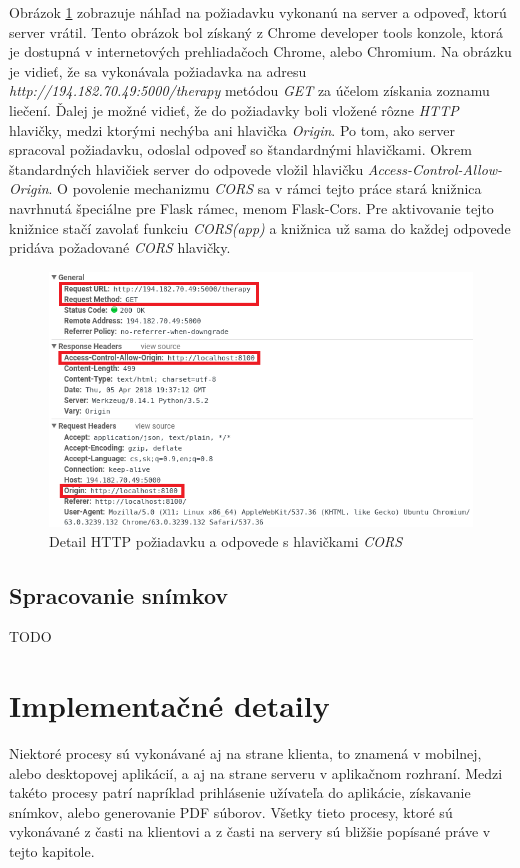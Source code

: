 Obrázok \ref{fig:cors} zobrazuje náhľad na požiadavku vykonanú na server a odpoveď, ktorú server vrátil. Tento obrázok bol získaný z Chrome developer tools konzole, ktorá je dostupná v internetových prehliadačoch Chrome, alebo Chromium. Na obrázku je vidieť, že sa vykonávala požiadavka na adresu \textit{http://194.182.70.49:5000/therapy} metódou \textit{GET} za účelom získania zoznamu liečení. Ďalej je možné vidieť, že do požiadavky boli vložené rôzne \textit{HTTP} hlavičky, medzi ktorými nechýba ani hlavička \textit{Origin}. Po tom, ako server spracoval požiadavku, odoslal odpoveď so štandardnými hlavičkami. Okrem štandardných hlavičiek server do odpovede vložil hlavičku \textit{Access-Control-Allow-Origin}. O povolenie mechanizmu \textit{CORS} sa v rámci tejto práce stará knižnica navrhnutá špeciálne pre Flask rámec, menom Flask-Cors.  Pre aktivovanie tejto knižnice stačí zavolať funkciu \textit{CORS(app)} a knižnica už sama do každej odpovede pridáva požadované \textit{CORS} hlavičky.
\begin{figure}[h]
  \centering
  \includegraphics[scale=0.8]{fig/cors.png}
  \caption{Detail HTTP požiadavku a odpovede s hlavičkami \textit{CORS}}
  \label{fig:cors}
\end{figure}

\subsection{Spracovanie snímkov}
TODO

\section{Implementačné detaily}
Niektoré procesy sú vykonávané aj na strane klienta, to znamená v mobilnej, alebo desktopovej aplikácií, a aj na strane serveru v aplikačnom rozhraní. Medzi takéto procesy patrí napríklad prihlásenie užívateľa do aplikácie, získavanie snímkov, alebo generovanie PDF súborov. Všetky tieto procesy, ktoré sú vykonávané z časti na klientovi a z časti na servery sú bližšie popísané práve v tejto kapitole.

